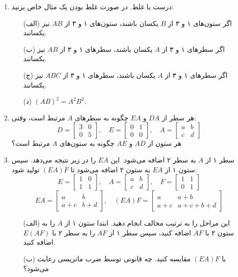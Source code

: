 \documentclass[12pt, a4paper]{book}
\begin{document}
\begin{enumerate}
		\item درست یا غلط. در صورت غلط بودن یک مثال خاص بزنید:
		\begin{itemize}
			\item[(الف)] اگر ستون‌های ۱ و ۳ از $B$ یکسان باشند، ستون‌های ۱ و ۳ از $AB$ نیز یکسانند.
			\item[(ب)] اگر سطرهای ۱ و ۳ از $A$ یکسان باشند، سطرهای ۱ و ۳ از $AB$ نیز یکسانند.
			\item[(ج)] اگر سطرهای ۱ و ۳ از $A$ یکسان باشند، سطرهای ۱ و ۳ از $ABC$ نیز یکسانند.
			\item[(د)] $(AB)^2 = A^2B^2$.
		\end{itemize}
		
		\item هر سطر از $DA$ و $EA$ چگونه به سطرهای $A$ مرتبط است، وقتی:
		\[ D = \begin{bmatrix} 3 & 0 \\ 0 & 5 \end{bmatrix}, \quad E = \begin{bmatrix} 0 & 1 \\ 0 & 0 \end{bmatrix}, \quad A = \begin{bmatrix} a & b \\ c & d \end{bmatrix} \]
		هر ستون از $AD$ و $AE$ چگونه به ستون‌های $A$ مرتبط است؟
		
		\item سطر ۱ از $A$ به سطر ۲ اضافه می‌شود. این $EA$ را در زیر نتیجه می‌دهد. سپس ستون ۱ از $EA$ به ستون ۲ اضافه می‌شود تا $(EA)F$ تولید شود:
		\[ E = \begin{bmatrix} 1 & 0 \\ 1 & 1 \end{bmatrix}, \quad A = \begin{bmatrix} a & b \\ c & d \end{bmatrix}, \quad F = \begin{bmatrix} 1 & 1 \\ 0 & 1 \end{bmatrix} \]
		\[ EA = \begin{bmatrix} a & b \\ a+c & b+d \end{bmatrix}, \quad (EA)F = \begin{bmatrix} a & a+b \\ a+c & a+c+b+d \end{bmatrix} \]
		\begin{itemize}
			\item[(الف)] این مراحل را به ترتیب مخالف انجام دهید. ابتدا ستون ۱ از $A$ را به ستون ۲ با $AF$ اضافه کنید، سپس سطر ۱ از $AF$ را به سطر ۲ با $E(AF)$ اضافه کنید.
			\item[(ب)] با $(EA)F$ مقایسه کنید. چه قانونی توسط ضرب ماتریسی رعایت می‌شود؟
		\end{itemize}
		

\end{enumerate}
\end{document}
